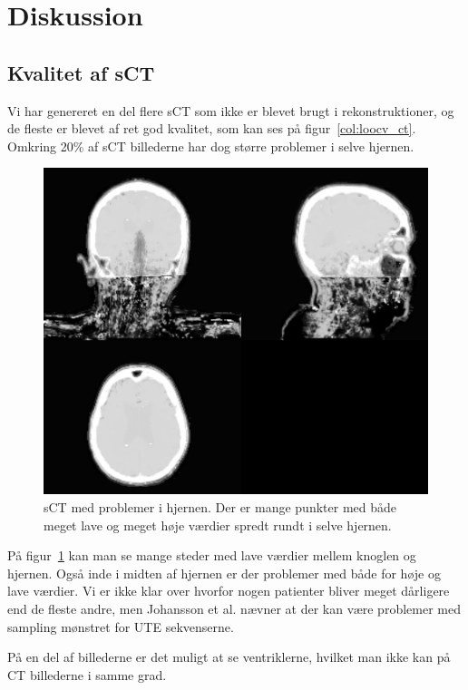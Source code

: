 \section{Diskussion}

\subsection{Kvalitet af sCT}


Vi har genereret en del flere sCT som ikke er blevet brugt i rekonstruktioner,  og de fleste er blevet af ret god kvalitet, som kan ses på figur~\ref{col:loocv_ct}. Omkring 20\% af sCT billederne har dog større problemer i selve hjernen.

\begin{figure}
   \includegraphics[width=\textwidth]{billeder/sct_problemer.png}
   \caption{sCT med problemer i hjernen. Der er mange punkter med både meget lave og meget høje værdier spredt rundt i selve hjernen.}
   \label{sct_problemer}
\end{figure}

På figur~\ref{sct_problemer} kan man se mange steder med lave værdier mellem knoglen og hjernen. Også inde i midten af hjernen er der problemer med både for høje og lave værdier. Vi er ikke klar over hvorfor nogen patienter bliver meget dårligere end de fleste andre, men Johansson et al. nævner at der kan være problemer med sampling mønstret for UTE sekvenserne.

På en del af billederne er det muligt at se ventriklerne, hvilket man ikke kan på CT billederne i samme grad.


